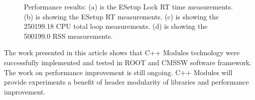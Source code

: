 \documentclass[12pt]{iopart}
\begin{document}
\begin{figure}
\begin{minipage}{.48\textwidth}
\end{minipage}\hfill
\begin{minipage}{.48\textwidth}
 \end{minipage}
 \caption{Performance results: (a) is the ESetup Lock RT time measurements. (b) is showing the ESetup RT  measurements. (c) is showing the 250199.18 CPU total loop measurements. (d) is showing the 500199.0 RSS measurements.}
\label{fig:performance1}
\end{figure}
 
 The work presented in this article shows that C++ Modules technology were successfully implemented and tested in ROOT and CMSSW software framework. The work on performance improvement is still ongoing. C++ Modules will provide experiments a benefit of header modularity of libraries and performance improvement.
\end{document}
